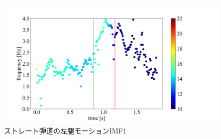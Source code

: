 

\begin{figure}
    \centering
    \includegraphics[width=1.0\linewidth]{./images/straight_data/left_up_leg/IMF4.png}
    \caption{ストレート弾道の左腿モーションIMF1}
    \label{straight left up leg imf4}
\end{figure}

